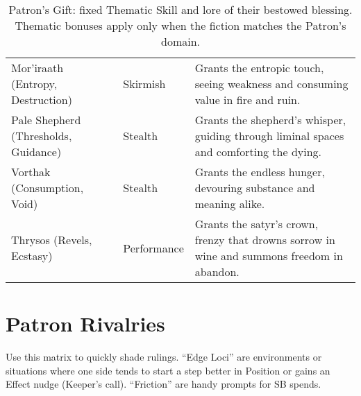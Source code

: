 \begin{table}[H]
\begin{tabular}{@{}p{3.8cm}p{3.8cm}p{7.5cm}@{}}
  Mor'iraath (Entropy, Destruction) & Skirmish & Grants the entropic touch, seeing weakness and consuming value in fire and ruin. \\
  Pale Shepherd (Thresholds, Guidance) & Stealth & Grants the shepherd's whisper, guiding through liminal spaces and comforting the dying. \\
  Vorthak (Consumption, Void) & Stealth & Grants the endless hunger, devouring substance and meaning alike. \\
  Thrysos (Revels, Ecstasy) & Performance & Grants the satyr’s crown, frenzy that drowns sorrow in wine and summons freedom in abandon. \\
  \bottomrule
  \end{tabular}
  \caption{Patron's Gift: fixed Thematic Skill and lore of their bestowed blessing. Thematic bonuses apply only when the fiction matches the Patron's domain.}
  \label{tab:gift-thematic-map}
\end{table}
  


\section*{Patron Rivalries}
\label{app:patron-rivalries}

Use this matrix to quickly shade rulings. “Edge Loci” are environments or situations where one side tends to start a step better in Position or gains an Effect nudge (Keeper’s call). “Friction” are handy prompts for SB spends.

\renewcommand{\arraystretch}{1.15}
\setlength{\LTpre}{0pt}
\setlength{\LTpost}{0pt}

